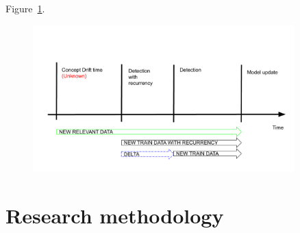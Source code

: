 Figure~\ref{fig:research_question}.
\begin{figure}[htb!]
	\centering
	\includegraphics[width=0.9\textwidth]{images/google_slides/scheme_cd_recurrency}
  \caption{
	}\label{fig:research_question}
\end{figure}


\section{Research methodology}


